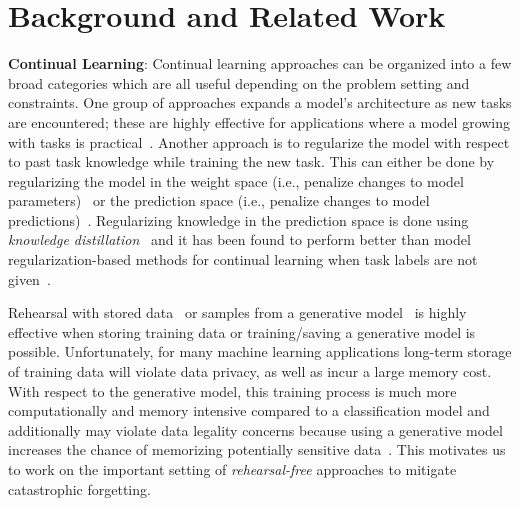 \section{Background and Related Work}
\label{sec:rl}

\noindent
\textbf{Continual Learning}: 
Continual learning approaches can be organized into a few broad categories which are all useful depending on the problem setting and constraints. One group of approaches expands a model's architecture as new tasks are encountered; these are highly effective for applications where a model growing with tasks is practical~\cite{ebrahimi2020adversarial,lee2020neural,lomonaco2017core50,maltoni2019continuous,Rusu:2016}. 
Another approach is to regularize the model with respect to past task knowledge while training the new task. This can either be done by regularizing the model in the  weight space (i.e., penalize changes to model parameters)~\cite{aljundi2017memory,ebrahimi2019uncertainty,kirkpatrick2017overcoming,titsias2019functional,zenke2017continual} or the prediction space (i.e., penalize changes to model predictions)~\cite{Ahn2021ssil,castro2018end,hou2018lifelong,lee2019overcoming,li2016learning}. Regularizing knowledge in the prediction space is done using \textit{knowledge distillation}~\cite{hinton2015distilling} and it has been found to perform better than model regularization-based methods for continual learning when task labels are not given~\cite{lesort2019generative,van2018generative}.

Rehearsal with stored data~\cite{aljundi2019online, aljundi2019gradient,bang2021rainbow,buzzega2020dark,chaudhry2018efficient,chaudhry2019episodic,Gepperth:2017,hayes2018memory,hou2019learning,Kemker:2017,Lopez-Paz:2017,Rebuffi:2016,robins1995catastrophic, rolnick2019experience,von2019continual,wu2019large} or samples from a generative model~\cite{kamra2017deep,kemker2018fear,ostapenko2019learning,Shin:2017,van2020brain} is highly effective when storing training data or training/saving a generative model is possible. Unfortunately, for many machine learning applications long-term storage of training data will violate data privacy, as well as incur a large memory cost. With respect to the generative model, this training process is much more computationally and memory intensive compared to a classification model and additionally may violate data legality concerns because using a generative model increases the chance of memorizing potentially sensitive data~\cite{nagarajan2018theoretical}. This motivates us to work on the important setting of \emph{rehearsal-free} approaches to mitigate catastrophic forgetting.

